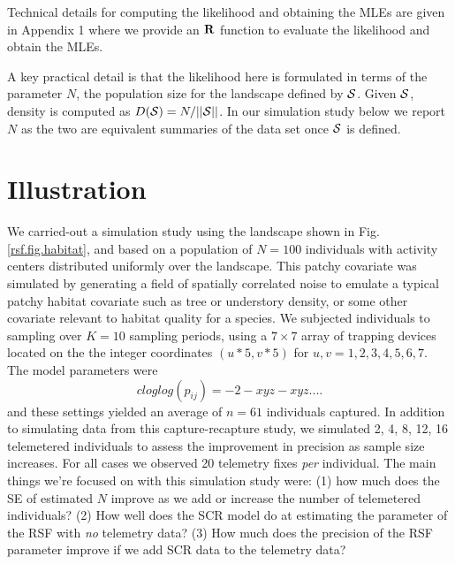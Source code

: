 Technical details for computing the likelihood and obtaining the MLEs
are given in Appendix 1 where we provide an ${\bf R}$ function to
evaluate the likelihood and obtain the MLEs.

A key practical detail
is that the likelihood here is formulated in terms of the parameter
$N$, the population size for the landscape defined by ${\cal
  S}$. Given ${\cal S}$, density is computed as $D({\cal S}) =
N/||{\cal S}||$. In our simulation study below we report $N$ as the
two are equivalent summaries of the data set once ${\cal S}$ is
defined.


\section{Illustration}


We carried-out a simulation study using the landscape shown in
Fig. \ref{rsf.fig.habitat}, and based on a population of $N=100$
individuals with activity centers distributed uniformly over the
landscape.  This patchy covariate was simulated by generating a field
of spatially correlated noise to emulate a typical patchy habitat
covariate such as tree or understory density, or some other covariate
relevant to habitat quality for a species.  We subjected individuals
to sampling over $K=10$ sampling periods, using a $7 \times 7$ array
of trapping devices located on the the integer coordinates $(u*5,v*5)$
for $u,v = 1,2,3,4,5,6,7$. The model parameters were
\[
 cloglog(p_{ij}) = -2 -xyz -xyz....
\]
and these settings yielded an average of $n=61$ individuals captured.
In addition to simulating data from this capture-recapture study, we
simulated 2, 4, 8, 12, 16 telemetered individuals to assess the
improvement in precision as sample size increases.  For all cases we
observed 20 telemetry fixes {\it per} individual.  The main things
we're focused on with this simulation study were: (1) how much does
the SE of estimated $N$ improve as we add or increase the number of
telemetered individuals?  (2) How well does the SCR model do at
estimating the parameter of the RSF with {\it no} telemetry data?  (3)
How much does the precision of the RSF parameter improve if we add SCR
data to the telemetry data?



